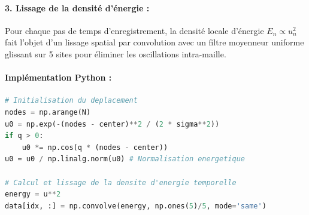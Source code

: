 \paragraph{3. Lissage de la densité d'énergie :}
Pour chaque pas de temps d'enregistrement, la densité locale d'énergie $E_n \propto u_n^2$ fait l'objet d'un lissage spatial par convolution avec un filtre moyenneur uniforme glissant sur 5 sites pour éliminer les oscillations intra-maille.

\paragraph{Implémentation Python :}
\begin{lstlisting}[language=Python, caption={Initialisation et lissage de l'excitation (choc et paquet d'ondes)}]
# Initialisation du deplacement
nodes = np.arange(N)
u0 = np.exp(-(nodes - center)**2 / (2 * sigma**2))
if q > 0:
    u0 *= np.cos(q * (nodes - center))
u0 = u0 / np.linalg.norm(u0) # Normalisation energetique

# Calcul et lissage de la densite d'energie temporelle
energy = u**2
data[idx, :] = np.convolve(energy, np.ones(5)/5, mode='same')
\end{lstlisting}
